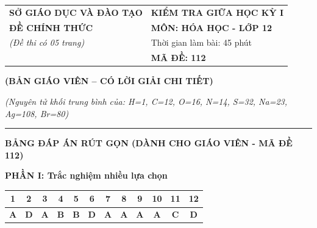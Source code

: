 \documentclass[11pt,a4paper]{article}
\begin{document}
\begin{table}[h!]
\centering
\begin{tabularx}{\textwidth}{@{}p{8.5cm}X@{}}
\textbf{SỞ GIÁO DỤC VÀ ĐÀO TẠO} & \textbf{KIỂM TRA GIỮA HỌC KỲ I} \\
\textbf{ĐỀ CHÍNH THỨC} & \textbf{MÔN: HÓA HỌC - LỚP 12} \\
\textit{(Đề thi có 05 trang)} & Thời gian làm bài: 45 phút \\
\textbf{ } & \textbf{MÃ ĐỀ: 112} \\
\end{tabularx}
\end{table}

\begin{center}
\textbf{\large\color{ansRed}(BẢN GIÁO VIÊN -- CÓ LỜI GIẢI CHI TIẾT)}
\end{center}


\noindent\textit{(Nguyên tử khối trung bình của: H=1, C=12, O=16, N=14, S=32, Na=23, Ag=108, Br=80)}
\par\vspace{-2pt}\noindent\textcolor{gray!40}{\rule{\textwidth}{0.5pt}}\par\vspace{2pt}


\begin{center}
\textbf{\color{ansRed}BẢNG ĐÁP ÁN RÚT GỌN (DÀNH CHO GIÁO VIÊN - MÃ ĐỀ 112)}
\end{center}
\textbf{\color{mainGreen}PHẦN I: Trắc nghiệm nhiều lựa chọn}
\begin{center}
\small
\begin{tabular}{|c|c|c|c|c|c|c|c|c|c|c|c|}
\hline
\rowcolor{tableGreen}
\textbf{1} & \textbf{2} & \textbf{3} & \textbf{4} & \textbf{5} & \textbf{6} & \textbf{7} & \textbf{8} & \textbf{9} & \textbf{10} & \textbf{11} & \textbf{12} \\
\hline
\textbf{\color{ansRed}A} & \textbf{\color{ansRed}D} & \textbf{\color{ansRed}A} & \textbf{\color{ansRed}B} & \textbf{\color{ansRed}B} & \textbf{\color{ansRed}D} & \textbf{\color{ansRed}A} & \textbf{\color{ansRed}A} & \textbf{\color{ansRed}A} & \textbf{\color{ansRed}A} & \textbf{\color{ansRed}C} & \textbf{\color{ansRed}D} \\
\hline
\end{tabular}
\end{center}
\end{document}
